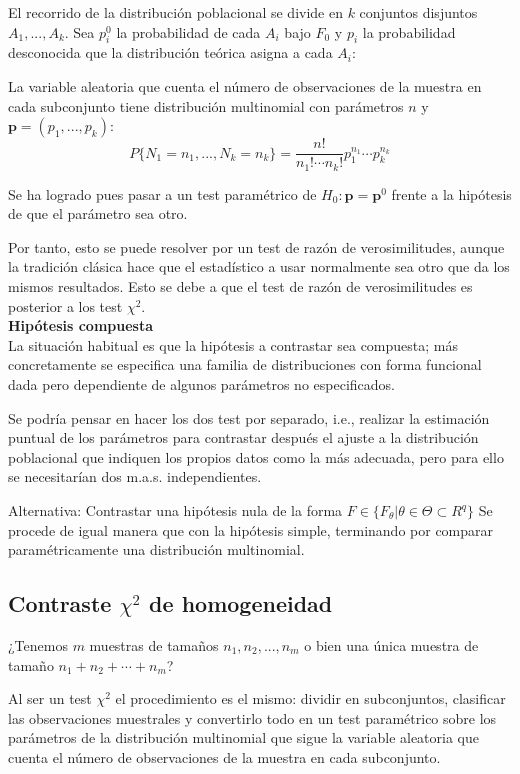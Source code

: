 \documentclass[a4paper,12pt]{article}
\begin{document}
El recorrido de la distribución poblacional se divide en $k$ conjuntos disjuntos $A_1,...,A_k$. Sea $p^0_i$ la probabilidad de cada $A_i$ bajo $F_0$ y $p_i$ la probabilidad desconocida que la distribución teórica asigna a cada $A_i$:

La variable aleatoria que cuenta el número de observaciones de la muestra en cada subconjunto tiene distribución multinomial con parámetros $n$ y $\textbf{p}= (p_1,...,p_k)$:
$$P\{N_1=n_1,...,N_k=n_k\}= \frac{n!}{n_1!\cdots n_k!} p^{n_1}_1\cdots p^{n_k}_k$$

Se ha logrado pues pasar a un test paramétrico de $H_0 :   \textbf{p} = \textbf{p}^0$ frente a la hipótesis de que el parámetro sea otro.

Por tanto, esto se puede resolver por un test de razón de verosimilitudes, aunque la tradición clásica hace que el estadístico a usar normalmente sea otro que da los mismos resultados. Esto se debe a que el test de razón de verosimilitudes es posterior a los test $\chi^2$.
\\

\textbf{Hipótesis compuesta} \\
La situación habitual es que la hipótesis a contrastar sea compuesta; más concretamente se especifica una familia de distribuciones con forma funcional dada pero dependiente de algunos parámetros no especificados.

Se podría pensar en hacer los dos test por separado, i.e., realizar la estimación puntual de los parámetros para contrastar después el ajuste a la distribución poblacional que indiquen los propios datos como la más adecuada, pero para ello se necesitarían dos m.a.s. independientes.

Alternativa: Contrastar una hipótesis nula de la forma $F \in \{F_\theta| \theta \in \Theta \subset R^q\}$
Se procede de igual manera que con la hipótesis simple, terminando por comparar paramétricamente una distribución multinomial.

\subsection{Contraste $\chi^2$ de homogeneidad}
¿Tenemos $m$ muestras de tamaños $n_1, n_2,...,n_m$ o bien una única muestra de tamaño $n_1+n_2+\cdots + n_m$?

Al ser un test $\chi ^2$ el procedimiento es el mismo: dividir en subconjuntos, clasificar las observaciones muestrales y convertirlo todo en un test paramétrico sobre los parámetros de la distribución multinomial que sigue la variable aleatoria que cuenta el número de observaciones de la muestra en cada subconjunto. 
\end{document}
